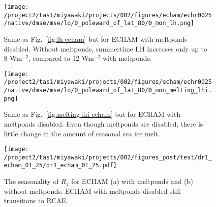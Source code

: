 \documentclass{article}
\begin{document}
\begin{figure}
    \texttt{[image: /project2/tas1/miyawaki/projects/002/figures/echam/echr0025/native/dmse/mse/lo/0\_poleward\_of\_lat\_80/0\_mon\_lh.png]}
    \caption{Same as Fig.~\ref{fig:lh-echam} but for ECHAM with meltponds disabled. Without meltponds, summertime LH increases only up to 8 Wm$^{-2}$, compared to 12 Wm$^{-2}$ with meltponds.}
    \label{fig:lh-echam25}
\end{figure}

\begin{figure}
    \texttt{[image: /project2/tas1/miyawaki/projects/002/figures/echam/echr0025/native/dmse/mse/lo/0\_poleward\_of\_lat\_80/0\_mon\_melting\_lhi.png]}
    \caption{Same as Fig.~\ref{fig:melting-lhi-echam} but for ECHAM with meltponds disabled. Even though meltponds are disabled, there is little change in the amount of seasonal sea ice melt.}
    \label{fig:melting-lhi-echam25}
\end{figure}

\begin{figure}
    \texttt{[image: /project2/tas1/miyawaki/projects/002/figures\_post/test/dr1\_echam\_01\_25/dr1\_echam\_01\_25.pdf]}
    \caption{The seasonality of $R_1$ for ECHAM (a) with meltponds and (b) without meltponds. ECHAM with meltponds disabled still transitions to RCAE.}
    \label{fig:dr1-echam-01-25}
\end{figure}




\end{document}
